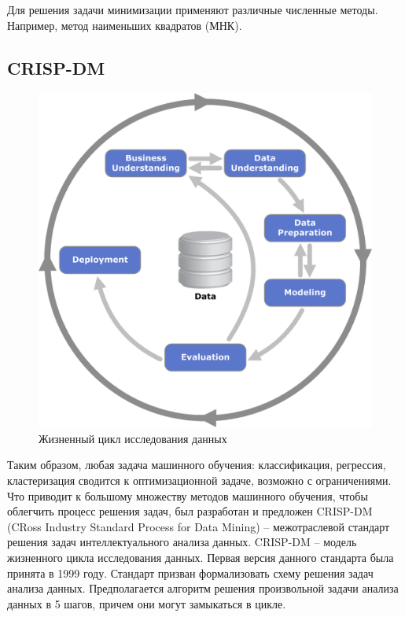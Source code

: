Для решения задачи минимизации применяют различные численные методы. Например, метод наименьших квадратов (МНК).


\subsection{CRISP-DM}

\begin{figure} 
    \vspace{-2ex}
    \includegraphics[width=\linewidth]{src/img/CRISP-DM_process_diagram.png}
    \caption{Жизненный цикл исследования данных \cite{wiki:crisp_dm}}
    \label{fig:crisp_dm}
\end{figure}

Таким образом, любая задача машинного обучения: классификация, регрессия, кластеризация сводится к оптимизационной задаче, возможно с ограничениями. Что приводит к большому множеству методов машинного обучения, чтобы облегчить процесс решения задач, был разработан и предложен CRISP-DM (CRoss Industry Standard Process for Data Mining) -- межотраслевой стандарт решения задач интеллектуального анализа данных. CRISP-DM -- модель жизненного цикла исследования данных.
Первая версия данного стандарта была принята в 1999 году. Стандарт призван формализовать схему решения задач анализа данных. Предполагается алгоритм решения произвольной задачи анализа данных в 5 шагов, причем они могут замыкаться в цикле.

